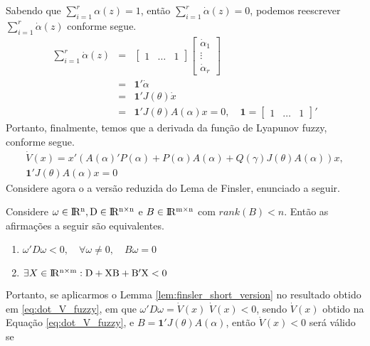 Sabendo que $\sum_{i = 1}^{r}\alpha(z) = 1$, então $\sum_{i = 1}^{r}\dot{\alpha}(z) = 0$, podemos reescrever $\sum_{i = 1}^{r}\dot{\alpha}(z)$ conforme segue.
\begin{equation*}
\begin{array} {lcl}
\sum_{i = 1}^{r}\dot{\alpha}(z) & = & \begin{bmatrix}1&\hdots&1\end{bmatrix}\begin{bmatrix}\dot{\alpha}_1\\\vdots\\\dot{\alpha}_r\end{bmatrix}\\
 & = & \textbf{1}'\dot{\alpha}\\
& = &\textbf{1}'J(\theta)\dot{x}\\
& = &\textbf{1}'J(\theta)A(\alpha)x = 0,\quad\textbf{1} = \begin{bmatrix}1&\hdots&1\end{bmatrix}'
\end{array}
\end{equation*}
Portanto, finalmente, temos que a derivada da função de Lyapunov fuzzy, conforme segue.
\begin{equation}\label{eq:dot_V_fuzzy}
\begin{array}{rcr}
\dot{V}(x) = x'(A(\alpha)'P(\alpha) + P(\alpha)A(\alpha) + Q(\gamma)J(\theta)A(\alpha))x,\\
\textbf{1}'J(\theta)A(\alpha)x = 0
\end{array}
\end{equation}
Considere agora o a versão reduzida do Lema de Finsler, enunciado a seguir.
\begin{lemma} Considere $\omega \in \rm I\!R^{n}, D \in \rm I\!R^{n \times n}$ e $B \in \rm I\!R^{m \times n}$  com $rank(B) < n$. Então as afirmações a seguir são equivalentes.
\begin{enumerate}
\item $\omega'D\omega < 0,\quad\forall\omega\neq0,\quad B\omega = 0$
\item $\exists X \in \rm I\!R^{n \times m} : D+XB + B'X <0$
\end{enumerate}
\label{lem:finsler_short_version}\end{lemma}
Portanto, se aplicarmos o Lemma \ref{lem:finsler_short_version} no resultado obtido em \ref{eq:dot_V_fuzzy}, em que $\omega' D \omega = \dot{V}(x)$ $\dot{V}(x) < 0$, sendo $\dot{V}(x)$ obtido na Equação \ref{eq:dot_V_fuzzy}, e $B = \textbf{1}'J(\theta)A(\alpha)$, então $\dot{V}(x) < 0$ será válido se
